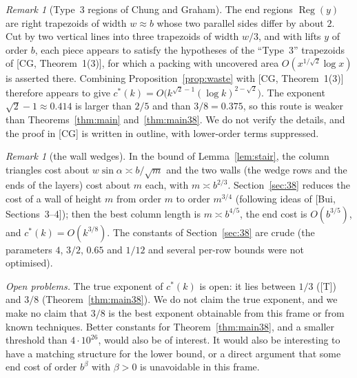 \documentclass[11pt]{amsart}
\newcommand{\Reg}{\operatorname{Reg}}
\newcommand{\cs}{c^{*}}
\theoremstyle{definition}
\theoremstyle{remark}
\newtheorem{remark}[theorem]{Remark}
\numberwithin{equation}{section}
\begin{document}
\begin{remark}[Type~3 regions of Chung and Graham]\label{rem:cg3}
The end regions $\Reg(y)$ are right trapezoids of width $w\approx b$ whose two parallel sides differ by about $2$.
Cut by two vertical lines into three trapezoids of width $w/3$, and with lifts $y$ of order $b$, each piece appears to
satisfy the hypotheses of the ``Type~3'' trapezoids of [CG, Theorem~1(3)], for which a packing with uncovered area
$O(x^{1/\sqrt2}\log x)$ is asserted there. Combining Proposition~\ref{prop:waste} with [CG, Theorem~1(3)] therefore
appears to give $\cs(k)=O\bigl(k^{\sqrt2-1}(\log k)^{2-\sqrt2}\bigr)$. The exponent $\sqrt2-1\approx0.414$ is larger
than $2/5$ and than $3/8=0.375$, so this route is weaker than Theorems~\ref{thm:main} and~\ref{thm:main38}. We do not
verify the details, and the proof in [CG] is written in outline, with lower-order terms suppressed.
\end{remark}

\begin{remark}[the wall wedges]\label{rem:bui4}
In the bound of Lemma~\ref{lem:stair}, the column triangles cost about $w\sin\alpha\asymp b/\sqrt m$ and the two walls
(the wedge rows and the ends of the layers) cost about $m$ each, with $m\asymp b^{2/3}$. Section~\ref{sec:38} reduces the
cost of a wall of height $m$ from order $m$ to order $m^{3/4}$ (following ideas of [Bui, Sections~3--4]); then the best
column length is $m\asymp b^{4/5}$, the end cost is $O(b^{3/5})$, and $\cs(k)=O(k^{3/8})$. The constants of
Section~\ref{sec:38} are crude (the parameters $4$, $3/2$, $0.65$ and $1/12$ and several per-row bounds were not
optimised).
\end{remark}

\emph{Open problems.} The true exponent of $\cs(k)$ is open: it lies between $1/3$ ([T]) and $3/8$
(Theorem~\ref{thm:main38}). We do not claim the true exponent, and we make no claim that $3/8$ is the best exponent
obtainable from this frame or from known techniques. Better constants for Theorem~\ref{thm:main38}, and a smaller
threshold than $4\cdot10^{26}$, would also be of interest. It would also be interesting to have a matching structure for the lower bound, or a direct argument that
some end cost of order $b^{\beta}$ with $\beta>0$ is unavoidable in this frame.

\appendix
\end{document}
